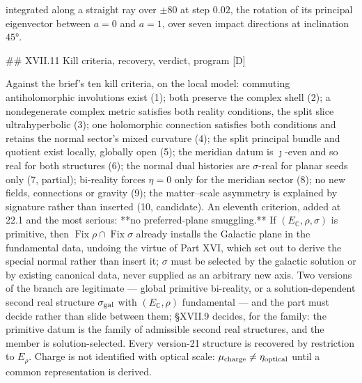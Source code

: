integrated along a straight ray over $\pm80$ at step $0.02$, the rotation of its principal eigenvector between $a = 0$ and $a = 1$, over seven impact directions at inclination $45°$.

## XVII.11 Kill criteria, recovery, verdict, program [D]

Against the brief's ten kill criteria, on the local model: commuting antiholomorphic involutions exist (1); both preserve the complex shell (2); a nondegenerate complex metric satisfies both reality conditions, the split slice ultrahyperbolic (3); one holomorphic connection satisfies both conditions and retains the normal sector's mixed curvature (4); the split principal bundle and quotient exist locally, globally open (5); the meridian datum is $\jmath$-even and so real for both structures (6); the normal dual histories are $\sigma$-real for planar seeds only (7, partial); bi-reality forces $\eta = 0$ only for the meridian sector (8); no new fields, connections or gravity (9); the matter–scale asymmetry is explained by signature rather than inserted (10, candidate). An eleventh criterion, added at 22.1 and the most serious: **no preferred-plane smuggling.** If $(E_{\mathbb C},\rho,\sigma)$ is primitive, then $\operatorname{Fix}\rho\cap\operatorname{Fix}\sigma$ already installs the Galactic plane in the fundamental data, undoing the virtue of Part XVI, which set out to derive the special normal rather than insert it; $\sigma$ must be selected by the galactic solution or by existing canonical data, never supplied as an arbitrary new axis. Two versions of the branch are legitimate — global primitive bi-reality, or a solution-dependent second real structure $\sigma_{\rm gal}$ with $(E_{\mathbb C},\rho)$ fundamental — and the part must decide rather than slide between them; §XVII.9 decides, for the family: the primitive datum is the family of admissible second real structures, and the member is solution-selected. Every version-21 structure is recovered by restriction to $E_\rho$. Charge is not identified with optical scale: $\mu_{\rm charge}\neq\eta_{\rm optical}$ until a common representation is derived.

